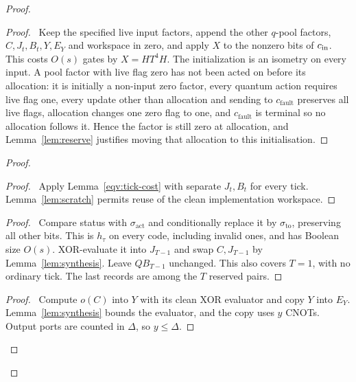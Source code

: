 \begin{proof}
 \begin{proof}\pf\ Keep the specified live input factors, append
 the other $q$-pool factors, $C,J_t,B_t,Y,E_Y$ and workspace in zero,
 and apply $X$ to the nonzero bits of $c_{\rm in}$. This costs $O(s)$
 gates by $X=HT^4H$. The initialization is an isometry on every input.
 A pool factor with live flag zero has not been acted on before its allocation: it is initially a non-input zero factor, every quantum action requires live flag one, every update other than allocation and sending to $c_{\mathrm{fault}}$ preserves all live flags, allocation changes one zero flag to one, and $c_{\mathrm{fault}}$ is terminal so no allocation follows it. Hence the factor is still zero at allocation, and Lemma~\ref{lem:reserve} justifies moving that allocation to this initialisation.\end{proof}
\begin{proof}
 \begin{proof}\pf\ Apply Lemma~\ref{eqv:tick-cost} with separate
 $J_t,B_t$ for every tick. Lemma~\ref{lem:scratch} permits reuse
 of the clean implementation workspace.\end{proof}
 \begin{proof}\pf\ Compare status with $\sigma_{\mathrm{act}}$ and
 conditionally replace it by $\sigma_{\mathrm{to}}$, preserving
 all other bits. This is $h_\tau$ on every code, including invalid
 ones, and has Boolean size $O(s)$. XOR-evaluate it into $J_{T-1}$
 and swap $C,J_{T-1}$ by Lemma~\ref{lem:synthesis}. Leave
 $QB_{T-1}$ unchanged. This also covers $T=1$, with no ordinary
 tick. The last records are among the $T$ reserved pairs.\end{proof}
 \begin{proof}\pf\ Compute $o(C)$ into $Y$ with its clean XOR
 evaluator and copy $Y$ into $E_Y$. Lemma~\ref{lem:synthesis}
 bounds the evaluator, and the copy uses $y$ CNOTs. Output ports
 are counted in $\Delta$, so $y\leq\Delta$.\end{proof}

\end{proof}
\end{proof}
